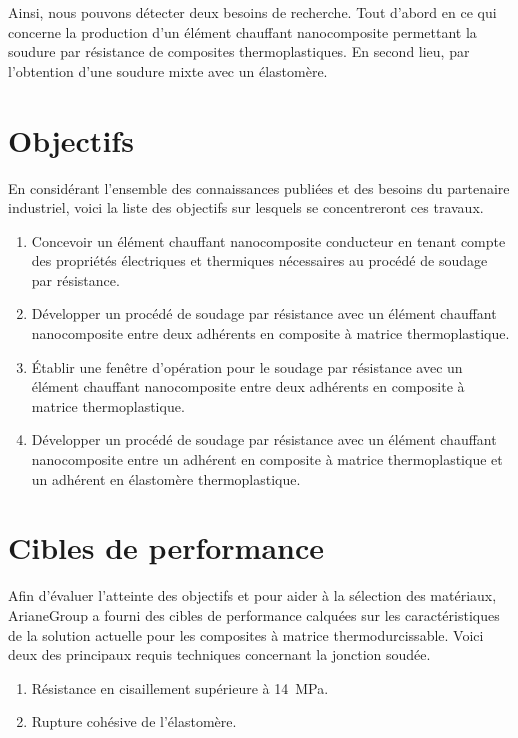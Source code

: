 Ainsi, nous pouvons détecter deux besoins de recherche. 
Tout d'abord en ce qui concerne la production d'un élément chauffant nanocomposite permettant la soudure par résistance de composites thermoplastiques. 
En second lieu, par l'obtention d'une soudure mixte avec un élastomère. 

\section{Objectifs}
\label{sec:objectifs}

En considérant l'ensemble des connaissances publiées et des besoins du partenaire industriel, voici la liste des objectifs sur lesquels se concentreront ces travaux. 

\begin{enumerate}
	\item Concevoir un élément chauffant nanocomposite conducteur en tenant compte des propriétés électriques et thermiques nécessaires au procédé de soudage par résistance. 
	\item Développer un procédé de soudage par résistance avec un élément chauffant nanocomposite entre deux adhérents en composite à matrice thermoplastique. 
	\item Établir une fenêtre d'opération pour le soudage par résistance avec un élément chauffant nanocomposite entre deux adhérents en composite à matrice thermoplastique. 
	\item Développer un procédé de soudage par résistance avec un élément chauffant nanocomposite entre un adhérent en composite à matrice thermoplastique et un adhérent en élastomère thermoplastique. 
\end{enumerate}

\section{Cibles de performance}

Afin d'évaluer l'atteinte des objectifs et pour aider à la sélection des matériaux, ArianeGroup a fourni des cibles de performance calquées sur les caractéristiques de la solution actuelle pour les composites à matrice thermodurcissable. 
Voici deux des principaux requis techniques concernant la jonction soudée. 

\begin{enumerate}
	\item Résistance en cisaillement supérieure à \SI[locale=FR]{14}{\mega\pascal}. 
	\item Rupture cohésive de l'élastomère. 
\end{enumerate}

